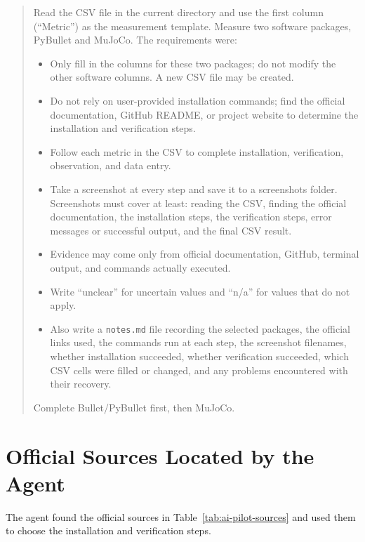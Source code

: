 \begin{quote}
\small
Read the CSV file in the current directory and use the first column
(``Metric'') as the measurement template. Measure two software packages,
PyBullet and MuJoCo. The requirements were:
\begin{itemize}[noitemsep]
  \item Only fill in the columns for these two packages; do not modify the other
        software columns. A new CSV file may be created.
  \item Do not rely on user-provided installation commands; find the official
        documentation, GitHub README, or project website to determine the
        installation and verification steps.
  \item Follow each metric in the CSV to complete installation, verification,
        observation, and data entry.
  \item Take a screenshot at every step and save it to a screenshots folder.
        Screenshots must cover at least: reading the CSV, finding the official
        documentation, the installation steps, the verification steps, error
        messages or successful output, and the final CSV result.
  \item Evidence may come only from official documentation, GitHub, terminal
        output, and commands actually executed.
  \item Write ``unclear'' for uncertain values and ``n/a'' for values that do
        not apply.
  \item Also write a \texttt{notes.md} file recording the selected packages, the
        official links used, the commands run at each step, the screenshot
        filenames, whether installation succeeded, whether verification
        succeeded, which CSV cells were filled or changed, and any problems
        encountered with their recovery.
\end{itemize}
Complete Bullet/PyBullet first, then MuJoCo.
\end{quote}

\section*{Official Sources Located by the Agent}

The agent found the official sources in Table~\ref{tab:ai-pilot-sources} and used
them to choose the installation and verification steps.

